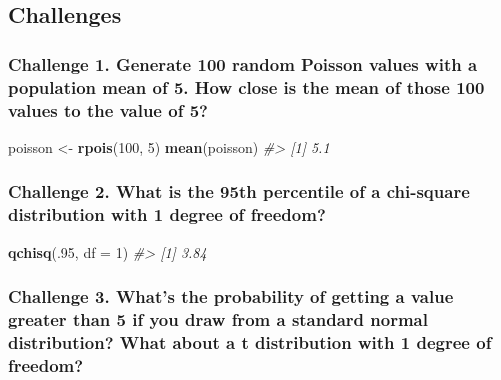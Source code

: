 \documentclass[]{book}
\newenvironment{Shaded}{\begin{snugshade}}{\end{snugshade}}
\newcommand{\KeywordTok}[1]{\textcolor[rgb]{0.13,0.29,0.53}{\textbf{#1}}}
\newcommand{\DataTypeTok}[1]{\textcolor[rgb]{0.13,0.29,0.53}{#1}}
\newcommand{\DecValTok}[1]{\textcolor[rgb]{0.00,0.00,0.81}{#1}}
\newcommand{\StringTok}[1]{\textcolor[rgb]{0.31,0.60,0.02}{#1}}
\newcommand{\CommentTok}[1]{\textcolor[rgb]{0.56,0.35,0.01}{\textit{#1}}}
\newcommand{\NormalTok}[1]{#1}
\begin{document}
\subsection{Challenges}\label{challenges-13}

\subsubsection*{Challenge 1. Generate 100 random Poisson values with a
population mean of 5. How close is the mean of those 100 values to the
value of
5?}\label{challenge-1.-generate-100-random-poisson-values-with-a-population-mean-of-5.-how-close-is-the-mean-of-those-100-values-to-the-value-of-5}

\begin{Shaded}
\begin{Highlighting}[]
\NormalTok{poisson <-}\StringTok{ }\KeywordTok{rpois}\NormalTok{(}\DecValTok{100}\NormalTok{, }\DecValTok{5}\NormalTok{)}
\KeywordTok{mean}\NormalTok{(poisson)}
\CommentTok{#> [1] 5.1}
\end{Highlighting}
\end{Shaded}

\subsubsection*{Challenge 2. What is the 95th percentile of a chi-square
distribution with 1 degree of
freedom?}\label{challenge-2.-what-is-the-95th-percentile-of-a-chi-square-distribution-with-1-degree-of-freedom}

\begin{Shaded}
\begin{Highlighting}[]
\KeywordTok{qchisq}\NormalTok{(.}\DecValTok{95}\NormalTok{, }\DataTypeTok{df =} \DecValTok{1}\NormalTok{)}
\CommentTok{#> [1] 3.84}
\end{Highlighting}
\end{Shaded}

\subsubsection*{Challenge 3. What's the probability of getting a value
greater than 5 if you draw from a standard normal distribution? What
about a t distribution with 1 degree of
freedom?}\label{challenge-3.-whats-the-probability-of-getting-a-value-greater-than-5-if-you-draw-from-a-standard-normal-distribution-what-about-a-t-distribution-with-1-degree-of-freedom}
\end{document}
